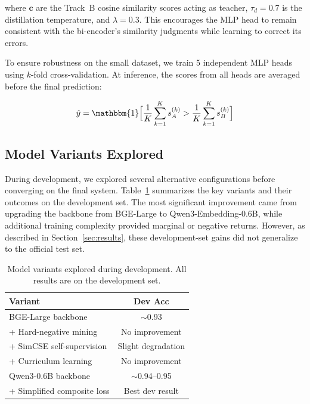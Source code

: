 \documentclass[11pt]{article}
\begin{document}
\noindent where $\mathbf{c}$ are the Track~B cosine similarity scores acting as teacher, $\tau_d = 0.7$ is the distillation temperature, and $\lambda = 0.3$. This encourages the MLP head to remain consistent with the bi-encoder's similarity judgments while learning to correct its errors.

To ensure robustness on the small dataset, we train 5 independent MLP heads using $k$-fold cross-validation. At inference, the scores from all heads are averaged before the final prediction:

\begin{equation}
\hat{y} = \mathbbm{1}\Bigl[\frac{1}{K}\sum_{k=1}^{K} s_A^{(k)} > \frac{1}{K}\sum_{k=1}^{K} s_B^{(k)}\Bigr]
\end{equation}


\subsection{Model Variants Explored}

During development, we explored several alternative configurations before converging on the final system. Table~\ref{tab:variants} summarizes the key variants and their outcomes on the development set. The most significant improvement came from upgrading the backbone from BGE-Large to Qwen3-Embedding-0.6B, while additional training complexity provided marginal or negative returns. However, as described in Section~\ref{sec:results}, these development-set gains did not generalize to the official test set.

\begin{table}[ht]
  \centering
  \small
  \begin{tabular}{lc}
    \hline
    \textbf{Variant} & \textbf{Dev Acc} \\
    \hline
    BGE-Large backbone              & $\sim$0.93 \\
    + Hard-negative mining          & No improvement \\
    + SimCSE self-supervision       & Slight degradation \\
    + Curriculum learning           & No improvement \\
    Qwen3-0.6B backbone             & $\sim$0.94--0.95 \\
    + Simplified composite loss     & Best dev result \\
    \hline
  \end{tabular}
  \caption{Model variants explored during development. All results are on the development set.}
  \label{tab:variants}
\end{table}
\end{document}

